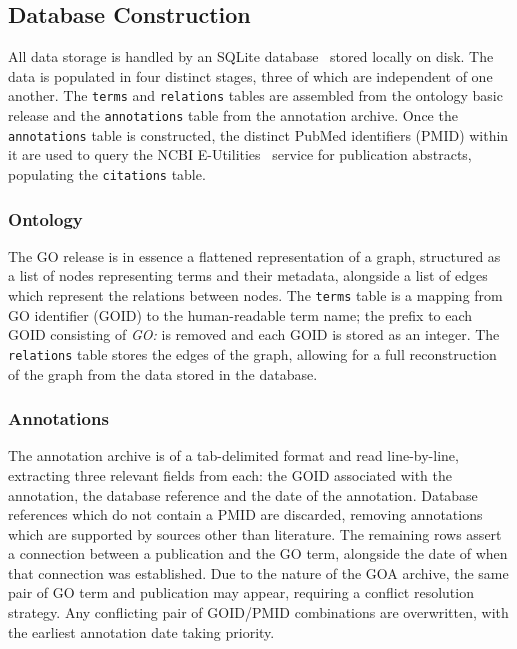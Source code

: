 \documentclass[11pt]{article}
\theoremstyle{plain}
\theoremstyle{definition}
\begin{document}
\subsection{Database Construction}\label{sec:methods-database}

All data storage is handled by an SQLite database~\cite{gaffney/2022/sqlite} stored locally on disk. The data is populated in four distinct stages, three of which are independent of one another. The \verb|terms| and \verb|relations| tables are assembled from the ontology basic release and the \verb|annotations| table from the annotation archive. Once the \verb|annotations| table is constructed, the distinct PubMed identifiers (PMID) within it are used to query the NCBI E-Utilities~\cite{sayers/2024/database} service for publication abstracts, populating the  \verb|citations| table.

\subsubsection{Ontology}\label{sec:methods-database-ontology}

The GO release is in essence a flattened representation of a graph, structured as a list of nodes representing terms and their metadata, alongside a list of edges which represent the relations between nodes. The \verb|terms| table is a mapping from GO identifier (GOID) to the human-readable term name; the prefix to each GOID consisting of \textit{GO:} is removed and each GOID is stored as an integer. The \verb|relations| table stores the edges of the graph, allowing for a full reconstruction of the graph from the data stored in the database.

\subsubsection{Annotations}\label{sec:methods-database-annotations}

The annotation archive is of a tab-delimited format and read line-by-line, extracting three relevant fields from each: the GOID associated with the annotation, the database reference and the date of the annotation. Database references which do not contain a PMID are discarded, removing annotations which are supported by sources other than literature. The remaining rows assert a connection between a publication and the GO term, alongside the date of when that connection was established. Due to the nature of the GOA archive, the same pair of GO term and publication may appear, requiring a conflict resolution strategy. Any conflicting pair of GOID/PMID combinations are overwritten, with the earliest annotation date taking priority.
\end{document}
